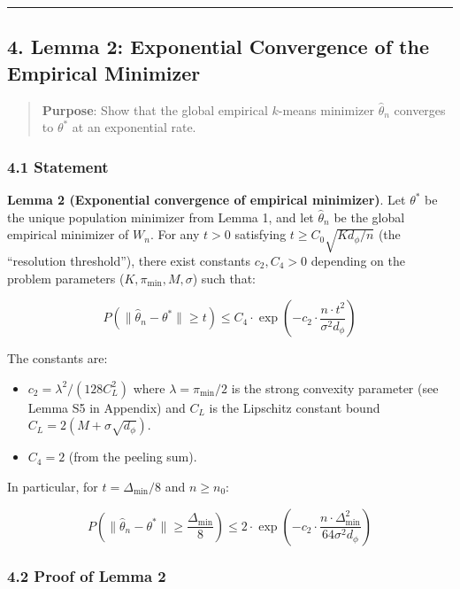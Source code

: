 \documentclass[
  12pt,
]{article}
\providecommand{\tightlist}{%
  \setlength{\itemsep}{0pt}\setlength{\parskip}{0pt}}
\begin{document}
\begin{center}\rule{0.5\linewidth}{0.5pt}\end{center}

\subsection{4. Lemma 2: Exponential Convergence of the Empirical
Minimizer}\label{lemma-2-exponential-convergence-of-the-empirical-minimizer}

\begin{quote}
\textbf{Purpose}: Show that the global empirical \(k\)-means minimizer
\(\hat{\theta}_n\) converges to \(\theta^*\) at an exponential rate.
\end{quote}

\subsubsection{4.1 Statement}\label{statement-1}

\textbf{Lemma 2 (Exponential convergence of empirical minimizer)}. Let
\(\theta^*\) be the unique population minimizer from Lemma 1, and let
\(\hat{\theta}_n\) be the global empirical minimizer of \(W_n\). For any
\(t > 0\) satisfying \(t \geq C_0 \sqrt{K d_\phi / n}\) (the
``resolution threshold''), there exist constants \(c_2, C_4 > 0\)
depending on the problem parameters (\(K, \pi_{\min}, M, \sigma\)) such
that:

\[P\left(\|\hat{\theta}_n - \theta^*\| \geq t\right) \leq C_4 \cdot \exp\left(-c_2 \cdot \frac{n \cdot t^2}{\sigma^2 d_\phi}\right)\]

The constants are:

\begin{itemize}
\tightlist
\item
  \(c_2 = \lambda^2 / (128 C_L^2)\) where \(\lambda = \pi_{\min} / 2\)
  is the strong convexity parameter (see Lemma S5 in Appendix) and
  \(C_L\) is the Lipschitz constant bound
  \(C_L = 2(M + \sigma\sqrt{d_\phi})\).
\item
  \(C_4 = 2\) (from the peeling sum).
\end{itemize}

In particular, for \(t = \Delta_{\min}/8\) and \(n \geq n_0\):

\[P\left(\|\hat{\theta}_n - \theta^*\| \geq \frac{\Delta_{\min}}{8}\right) \leq 2 \cdot \exp\left(-c_2 \cdot \frac{n \cdot \Delta_{\min}^2}{64 \sigma^2 d_\phi}\right)\]

\subsubsection{4.2 Proof of Lemma 2}\label{proof-of-lemma-2}
\end{document}
